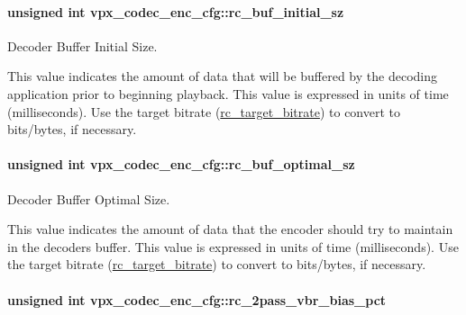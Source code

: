 \paragraph[{\texorpdfstring{rc\+\_\+buf\+\_\+initial\+\_\+sz}{rc_buf_initial_sz}}]{\setlength{\rightskip}{0pt plus 5cm}unsigned int vpx\+\_\+codec\+\_\+enc\+\_\+cfg\+::rc\+\_\+buf\+\_\+initial\+\_\+sz}\hypertarget{structvpx__codec__enc__cfg_aa9e4d6405994ef42d61d478cf6e0d5e0}{}\label{structvpx__codec__enc__cfg_aa9e4d6405994ef42d61d478cf6e0d5e0}


Decoder Buffer Initial Size. 

This value indicates the amount of data that will be buffered by the decoding application prior to beginning playback. This value is expressed in units of time (milliseconds). Use the target bitrate (\hyperlink{structvpx__codec__enc__cfg_ab8339685175d66710f482706cc9f0aed}{rc\+\_\+target\+\_\+bitrate}) to convert to bits/bytes, if necessary. 
\paragraph[{\texorpdfstring{rc\+\_\+buf\+\_\+optimal\+\_\+sz}{rc_buf_optimal_sz}}]{\setlength{\rightskip}{0pt plus 5cm}unsigned int vpx\+\_\+codec\+\_\+enc\+\_\+cfg\+::rc\+\_\+buf\+\_\+optimal\+\_\+sz}\hypertarget{structvpx__codec__enc__cfg_aafde485867e040a58504ad796e79e47f}{}\label{structvpx__codec__enc__cfg_aafde485867e040a58504ad796e79e47f}


Decoder Buffer Optimal Size. 

This value indicates the amount of data that the encoder should try to maintain in the decoder\textquotesingle{}s buffer. This value is expressed in units of time (milliseconds). Use the target bitrate (\hyperlink{structvpx__codec__enc__cfg_ab8339685175d66710f482706cc9f0aed}{rc\+\_\+target\+\_\+bitrate}) to convert to bits/bytes, if necessary. 
\paragraph[{\texorpdfstring{rc\+\_\+2pass\+\_\+vbr\+\_\+bias\+\_\+pct}{rc_2pass_vbr_bias_pct}}]{\setlength{\rightskip}{0pt plus 5cm}unsigned int vpx\+\_\+codec\+\_\+enc\+\_\+cfg\+::rc\+\_\+2pass\+\_\+vbr\+\_\+bias\+\_\+pct}\hypertarget{structvpx__codec__enc__cfg_a21c21ff097890dc3a450731c9b504cf4}{}\label{structvpx__codec__enc__cfg_a21c21ff097890dc3a450731c9b504cf4}


